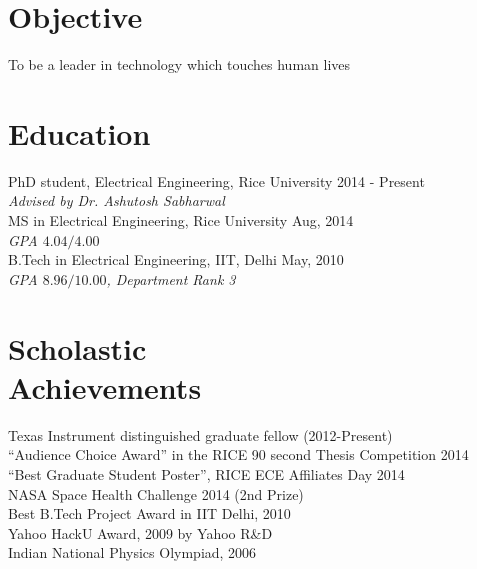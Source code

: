 \documentclass[margin]{res}
\begin{document}
 
 

\address{Rice University \\ ECE Department, MS-380 \\ 6100 Main Street  \\ Houston, TX 77005         }
        
\address{{} \\ \emph{Phone:}     832-593-1893 \\ \emph{Email:}   mk28@rice.edu }


 
\begin{resume} 
 
\section{Objective} 
To be a leader in technology which touches human lives  

\section{Education} 
PhD student, Electrical Engineering, Rice University \hfill{2014 - Present} \\
 \emph{Advised by Dr. Ashutosh Sabharwal} \\
MS in Electrical Engineering, Rice University \hfill{Aug, 2014}  \\
 \emph{GPA $4.04/4.00$} \\
B.Tech in Electrical Engineering, IIT, Delhi \hfill{May, 2010}  \\
 \emph{GPA $8.96 / 10.00$, Department Rank 3}   \\

\section{Scholastic \\ Achievements}
Texas Instrument distinguished graduate fellow (2012-Present) \\
“Audience Choice Award” in the RICE 90 second Thesis Competition 2014  \\
“Best Graduate Student Poster”, RICE ECE Affiliates Day 2014 \\
NASA Space Health Challenge 2014 (2nd Prize)  \\
Best B.Tech Project Award in IIT Delhi, 2010 \\
Yahoo HackU Award, 2009  by Yahoo R\&D \\
Indian National Physics Olympiad, 2006


\end{resume}
\end{document}
